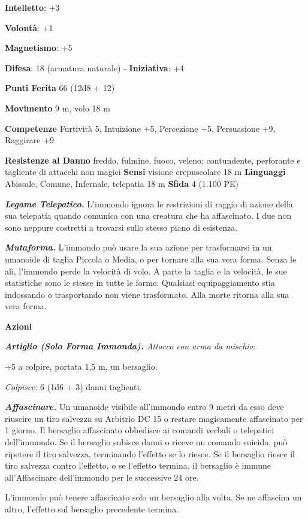 \begin{multicols}{2}
\textbf{Intelletto}: +3

\textbf{Volontà}: +1

\textbf{Magnetismo}: +5

\textbf{Difesa}: 18 (armatura naturale) - \textbf{Iniziativa}: +4

\textbf{Punti Ferita} 66 (12d8 + 12)

\textbf{Movimento} 9 m, volo 18 m

\textbf{Competenze} Furtività 5, Intuizione +5, Percezione +5, Persuasione
+9, Raggirare +9

\textbf{Resistenze al Danno} freddo, fulmine, fuoco, veleno;
contundente, perforante e tagliente di attacchi non magici
\textbf{Sensi} visione crepuscolare 18 m
\textbf{Linguaggi} Abissale, Comune, Infernale, telepatia 18 m
\textbf{Sfida} 4 (1.100 PE)

\emph{\textbf{Legame Telepatico.}} L'immondo ignora le restrizioni di
raggio di azione della sua telepatia quando comunica con una creatura
che ha affascinato. I due non sono neppure costretti a trovarsi sullo
stesso piano di esistenza.

\emph{\textbf{Mutaforma.}} L'immondo può usare la sua azione per
trasformarsi in un umanoide di taglia Piccola o Media, o per tornare
alla sua vera forma. Senza le ali, l'immondo perde la velocità di volo.
A parte la taglia e la velocità, le sue statistiche sono le stesse in
tutte le forme. Qualsiasi equipaggiamento stia indossando o trasportando
non viene trasformato. Alla morte ritorna alla sua vera forma.

\textbf{Azioni}

\emph{\textbf{Artiglio (Solo Forma Immonda).} Attacco con arma da
mischia}:

+5 a colpire, portata 1,5 m, un bersaglio.

\emph{Colpisce:} 6 (1d6 + 3) danni taglienti.

\emph{\textbf{Affascinare.}} Un umanoide visibile all'immondo entro 9
metri da esso deve riuscire un tiro salvezza su Arbitrio DC 15 o restare
magicamente affascinato per 1 giorno. Il bersaglio affascinato obbedisce
ai comandi verbali o telepatici dell'immondo. Se il bersaglio subisce
danni o riceve un comando suicida, può ripetere il tiro salvezza,
terminando l'effetto se lo riesce. Se il bersaglio riesce il tiro
salvezza contro l'effetto, o se l'effetto termina, il bersaglio è immune
all'Affascinare dell'immondo per le successive 24 ore.

L'immondo può tenere affascinato solo un bersaglio alla volta. Se ne
affascina un altro, l'effetto sul bersaglio precedente termina.


\end{multicols}
